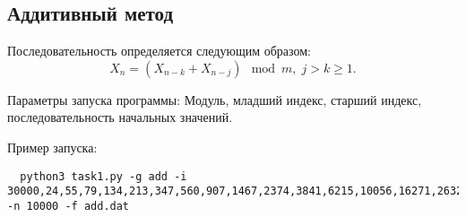 \documentclass[spec, och, labwork]{shiza}
\begin{document}
\subsection{Аддитивный метод}

Последовательность определяется следующим образом:
\begin{equation}
  X_n = (X_{n - k} + X_{n - j}) \mod m, \; j > k \geq 1.
\end{equation}

Параметры запуска программы: Модуль, младший индекс, старший индекс, последовательность начальных
значений.

Пример запуска:
\begin{small}
\begin{verbatim}
  python3 task1.py -g add -i 30000,24,55,79,134,213,347,560,907,1467,2374,3841,6215,10056,16271,26327,12598,8925,21523,448,21971,22419,14390,6809,21199,28008,19207,17215,6422,23637,59,23696,23755,17451,11206,28657,9863,8520,18383,26903,15286,12189,27475,9664,7139,16803,23942,10745,4687,15432,20119,5551,25670,1221,26891,28112,23779,17506 -n 10000 -f add.dat
\end{verbatim}
\end{small}
\end{document}
